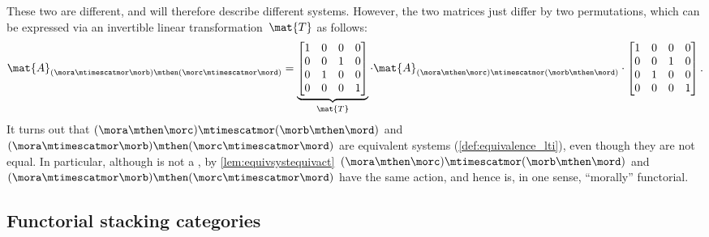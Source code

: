 \begin{example}
    These two are different, and will therefore describe different systems.
    However, the two matrices just differ by two permutations, which can be expressed via an invertible linear transformation~$\mat{T}$ as follows:
    \begin{equation}\label{eq:checking-LTI-functorial-stacking-3}
        \mat{A}_{(\mora\mtimescatmor \morb)\mthen (\morc\mtimescatmor \mord)}=
        \underbrace{\begin{bmatrix}
                1 & 0 & 0 & 0 \\
                0 & 0 & 1 & 0 \\
                0 & 1 & 0 & 0 \\
                0 & 0 & 0 & 1
            \end{bmatrix}}_{\mat{T}}\cdot
        \mat{A}_{(\mora \mthen \morc)\mtimescatmor (\morb\mthen \mord)}
        \cdot
        \begin{bmatrix}
            1 & 0 & 0 & 0 \\
            0 & 0 & 1 & 0 \\
            0 & 1 & 0 & 0 \\
            0 & 0 & 0 & 1
        \end{bmatrix}.
    \end{equation}
    It turns out that $(\mora \mthen \morc)\mtimescatmor (\morb\mthen \mord)$ and~$(\mora\mtimescatmor \morb)\mthen (\morc\mtimescatmor \mord)$ are equivalent systems (\cref{def:equivalence_lti}), even though they are not equal.
    In particular, although \LTI is not a , by \cref{lem:equivsystequivact}~$(\mora \mthen \morc)\mtimescatmor (\morb\mthen \mord)$ and~$(\mora\mtimescatmor \morb)\mthen (\morc\mtimescatmor \mord)$ have the same action, and hence \LTI is, in one sense, ``morally'' functorial.
\end{example}

\subsection{Functorial stacking categories}

